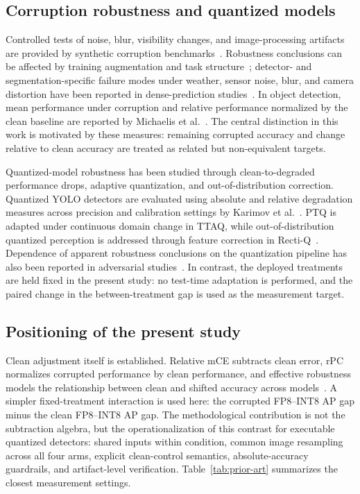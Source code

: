 \documentclass[a4paper,fleqn]{cas-dc}
\begin{document}
\subsection{Corruption robustness and quantized models}

Controlled tests of noise, blur, visibility changes, and image-processing artifacts are provided by synthetic corruption benchmarks~\citep{hendrycks2019corruptions}. Robustness conclusions can be affected by training augmentation and task structure~\citep{mintun2021augmentations}; detector- and segmentation-specific failure modes under weather, sensor noise, blur, and camera distortion have been reported in dense-prediction studies~\citep{kamann2020segrobustness,michaelis2019detectorrobustness,liu2024realworldcorruptions}. In object detection, mean performance under corruption and relative performance normalized by the clean baseline are reported by Michaelis et al.~\citep{michaelis2019detectorrobustness}. The central distinction in this work is motivated by these measures: remaining corrupted accuracy and change relative to clean accuracy are treated as related but non-equivalent targets.

Quantized-model robustness has been studied through clean-to-degraded performance drops, adaptive quantization, and out-of-distribution correction. Quantized YOLO detectors are evaluated using absolute and relative degradation measures across precision and calibration settings by Karimov et al.~\citep{karimov2025robustness}. PTQ is adapted under continuous domain change in TTAQ, while out-of-distribution quantized perception is addressed through feature correction in Recti-Q~\citep{xiao2024ttaq,araghi2026rectiq}. Dependence of apparent robustness conclusions on the quantization pipeline has also been reported in adversarial studies~\citep{li2024quantrobustness}. In contrast, the deployed treatments are held fixed in the present study: no test-time adaptation is performed, and the paired change in the between-treatment gap is used as the measurement target.

\subsection{Positioning of the present study}

Clean adjustment itself is established. Relative mCE subtracts clean error, rPC normalizes corrupted performance by clean performance, and effective robustness models the relationship between clean and shifted accuracy across models~\citep{hendrycks2019corruptions,michaelis2019detectorrobustness,taori2020measuring}. A simpler fixed-treatment interaction is used here: the corrupted FP8--INT8 AP gap minus the clean FP8--INT8 AP gap. The methodological contribution is not the subtraction algebra, but the operationalization of this contrast for executable quantized detectors: shared inputs within condition, common image resampling across all four arms, explicit clean-control semantics, absolute-accuracy guardrails, and artifact-level verification. Table~\ref{tab:prior-art} summarizes the closest measurement settings.
\end{document}
